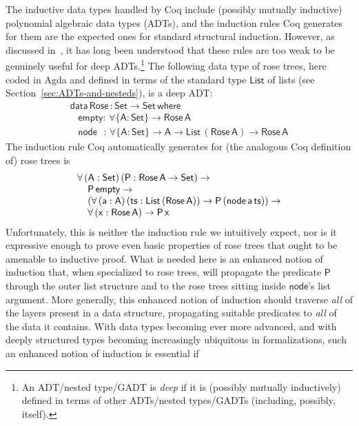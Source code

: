 \documentclass[sigplan,10pt]{acmart}
\begin{document}
The inductive data types handled by Coq include (possibly mutually
inductive) polynomial algebraic data types (ADTs), and the induction
rules Coq generates for them are the expected ones for standard
structural induction. However, as discussed in~\cite{jp20}, it has
long been understood that these rules are too weak to be genuinely
useful for deep ADTs.\footnote{An ADT/nested type/GADT is {\em deep}
  if it is (possibly mutually inductively) defined in terms of other
  ADTs/nested types/GADTs (including, possibly, itself).}  The
following data type of rose trees, here coded in Agda and defined in
terms of the standard type $\mathsf{List}$ of lists (see
Section~\ref{sec:ADTs-and-nesteds}), is a deep ADT:
\[\begin{array}{l}
\mathsf{data\, Rose\, : Set \to Set\,where}\\
\mathsf{\;\;\;empty :\,\forall \{A : Set\} \to Rose\,A}\\
\mathsf{\;\;\;node\,\,\,\, :\, \forall \{A : Set\} \to A \to List\,(Rose\,A) \to Rose\,A} 
\end{array}\]
The induction rule Coq automatically generates for (the analogous Coq
definition of) rose trees is
\[\begin{array}{l}
\mathsf{\forall\, (A : Set)\,(P : Rose\,A \to Set) \to}\\
\mathsf{\hspace*{0.15in}P\,empty \to}\\
\mathsf{\hspace*{0.15in}
 (\forall\, (a : A)\,(ts :
  List\,(Rose\,A)) \to P\,(node\,a\,ts)) \to}\\ 
\hspace*{0.15in}  \mathsf{\forall \,(x : Rose\,A) \to P\,x}
\end{array}\]
\noindent
Unfortunately, this is neither the induction rule we intuitively
expect, nor is it expressive enough to prove even basic properties of
rose trees that ought to be amenable to inductive proof. What is
needed here is an enhanced notion of induction that, when specialized
to rose trees, will propagate the predicate $\mathsf{P}$ through the
outer list structure and to the rose trees sitting inside
$\mathsf{node}$'s list argument. More generally, this enhanced notion
of induction should traverse {\em all} of the layers present in a data
structure, propagating suitable predicates to {\em all} of the data it
contains.  With data types becoming ever more advanced, and with
deeply structured types becoming increasingly ubiquitous in
formalizations, such an enhanced notion of induction is essential if
\end{document}
